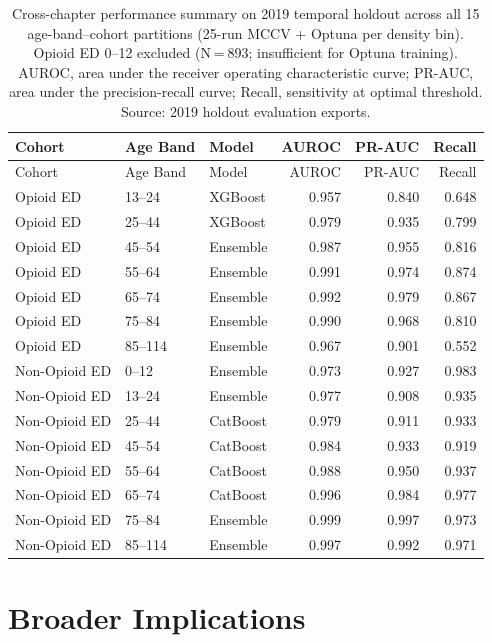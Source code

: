 \documentclass[
  12pt,
]{book}
\begin{document}
\begin{longtable}[]{@{}lllrrr@{}}
\caption{Cross-chapter performance summary on 2019 temporal holdout
across all 15 age-band--cohort partitions (25-run MCCV + Optuna per
density bin). Opioid ED 0--12 excluded (N = 893; insufficient for Optuna
training). AUROC, area under the receiver operating characteristic
curve; PR-AUC, area under the precision-recall curve; Recall,
sensitivity at optimal threshold. Source: 2019 holdout evaluation
exports.}\label{tbl-performance}\tabularnewline
\toprule\noalign{}
Cohort & Age Band & Model & AUROC & PR-AUC & Recall \\
\midrule\noalign{}
\endfirsthead
\toprule\noalign{}
Cohort & Age Band & Model & AUROC & PR-AUC & Recall \\
\midrule\noalign{}
\endhead
\bottomrule\noalign{}
\endlastfoot
Opioid ED & 13--24 & XGBoost & 0.957 & 0.840 & 0.648 \\
Opioid ED & 25--44 & XGBoost & 0.979 & 0.935 & 0.799 \\
Opioid ED & 45--54 & Ensemble & 0.987 & 0.955 & 0.816 \\
Opioid ED & 55--64 & Ensemble & 0.991 & 0.974 & 0.874 \\
Opioid ED & 65--74 & Ensemble & 0.992 & 0.979 & 0.867 \\
Opioid ED & 75--84 & Ensemble & 0.990 & 0.968 & 0.810 \\
Opioid ED & 85--114 & Ensemble & 0.967 & 0.901 & 0.552 \\
Non-Opioid ED & 0--12 & Ensemble & 0.973 & 0.927 & 0.983 \\
Non-Opioid ED & 13--24 & Ensemble & 0.977 & 0.908 & 0.935 \\
Non-Opioid ED & 25--44 & CatBoost & 0.979 & 0.911 & 0.933 \\
Non-Opioid ED & 45--54 & CatBoost & 0.984 & 0.933 & 0.919 \\
Non-Opioid ED & 55--64 & CatBoost & 0.988 & 0.950 & 0.937 \\
Non-Opioid ED & 65--74 & CatBoost & 0.996 & 0.984 & 0.977 \\
Non-Opioid ED & 75--84 & Ensemble & 0.999 & 0.997 & 0.973 \\
Non-Opioid ED & 85--114 & Ensemble & 0.997 & 0.992 & 0.971 \\
\end{longtable}

\chapter{Broader Implications}\label{sec-implications}
\end{document}
